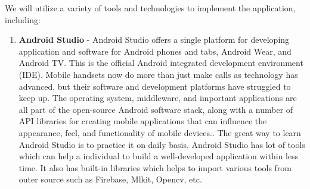 \documentclass[MScCS]{uccthesis}
\begin{document}
We will utilize a variety of tools and technologies to implement the application, including:
\begin{enumerate}
    \item \textbf{Android Studio} - Android Studio offers a single platform for developing application and software for Android phones and tabs, Android Wear, and Android TV. This is the official Android integrated development environment (IDE). Mobile handsets now do more than just make calls as technology has advanced, but their software and development platforms have struggled to keep up. The operating system, middleware, and important applications are all part of the open-source Android software stack, along with a number of API libraries for creating mobile applications that can influence the appearance, feel, and functionality of mobile devices.\Parencite{Android1}. The great way to learn Android Studio is to practice it on daily basis. Android Studio has lot of tools which can help a individual to build a well-developed application within less time. It also has built-in libraries which helps to import various tools from outer source such as Firebase, Mlkit, Opencv, etc.
    

\end{enumerate}
\end{document}
